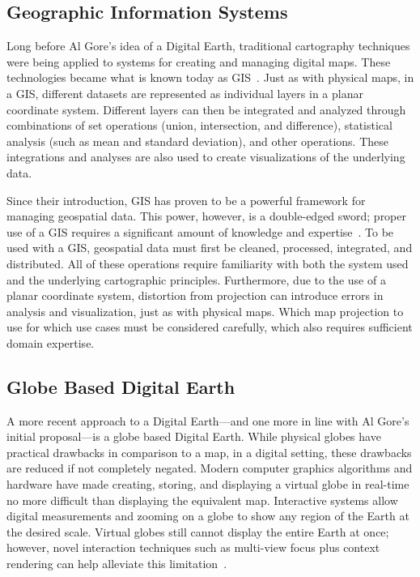 \subsection{Geographic Information Systems}
Long before Al Gore's idea of a Digital Earth, traditional cartography techniques were being applied to systems for creating and managing digital maps.
These technologies became what is known today as GIS~\cite{foresman1998history}.
Just as with physical maps, in a GIS, different datasets are represented as individual layers in a planar coordinate system.
Different layers can then be integrated and analyzed through combinations of set operations (union, intersection, and difference), statistical analysis (such as mean and standard deviation), and other operations.
These integrations and analyses are also used to create visualizations of the underlying data.


Since their introduction, GIS has proven to be a powerful framework for managing geospatial data.
This power, however, is a double-edged sword; proper use of a GIS requires a significant amount of knowledge and expertise~\cite{antenucci1991geographic}.
To be used with a GIS, geospatial data must first be cleaned, processed, integrated, and distributed.
All of these operations require familiarity with both the system used and the underlying cartographic principles.
Furthermore, due to the use of a planar coordinate system, distortion from projection can introduce errors in analysis and visualization, just as with physical maps.
Which map projection to use for which use cases must be considered carefully, which also requires sufficient domain expertise.


\subsection{Globe Based Digital Earth}
A more recent approach to a Digital Earth---and one more in line with Al Gore's initial proposal---is a globe based Digital Earth.
While physical globes have practical drawbacks in comparison to a map, in a digital setting, these drawbacks are reduced if not completely negated. 
Modern computer graphics algorithms and hardware have made creating, storing, and displaying a virtual globe in real-time no more difficult than displaying the equivalent map.
Interactive systems allow digital measurements and zooming on a globe to show any region of the Earth at the desired scale.
Virtual globes still cannot display the entire Earth at once; however, novel interaction techniques such as multi-view focus plus context rendering can help alleviate this limitation~\cite{mark-sherlock}.


